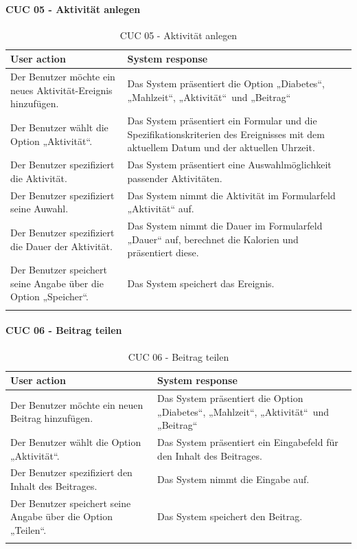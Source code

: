 \paragraph{CUC 05 - Aktivität anlegen}
\begin{center}
	\begin{longtable}[H]{|p{6cm}|p{6cm}|}
		\hline
		\textbf{User action} & \textbf{System response}\\
		\hline
		Der Benutzer möchte ein neues Aktivität-Ereignis hinzufügen. & Das System präsentiert die Option „Diabetes“, „Mahlzeit“, „Aktivität“\ und „Beitrag“\\
		\hline
		Der Benutzer wählt die Option „Aktivität“. &  Das System präsentiert ein Formular und die Spezifikationskriterien des Ereignisses mit dem aktuellem Datum und der aktuellen Uhrzeit.\\
		\hline
		Der Benutzer spezifiziert die Aktivität. & Das System präsentiert eine Auswahlmöglichkeit passender Aktivitäten.\\
		\hline
		Der Benutzer spezifiziert seine Auwahl. & Das System nimmt die Aktivität im Formularfeld „Aktivität“ auf.\\
		\hline
		Der Benutzer spezifiziert die Dauer der Aktivität. & Das System nimmt die Dauer im Formularfeld „Dauer“ auf, berechnet die Kalorien und präsentiert diese.\\
		\hline
		Der Benutzer speichert seine Angabe über die Option „Speicher“. & Das System speichert das Ereignis.\\
		\hline
		\captionsetup{justification=centering}
		\caption{CUC 05 - Aktivität anlegen}
		\label{tab:Persona Use Cases 5}
	\end{longtable}
\end{center}
\paragraph{CUC 06 - Beitrag teilen}
\begin{center}
\begin{longtable}[H]{|p{6cm}|p{6cm}|}
	\hline
	\textbf{User action} & \textbf{System response}\\
	\hline
	Der Benutzer möchte ein neuen Beitrag hinzufügen. & Das System präsentiert die Option „Diabetes“, „Mahlzeit“, „Aktivität“\ und „Beitrag“\\
	\hline
	Der Benutzer wählt die Option „Aktivität“. &  Das System präsentiert ein Eingabefeld für den Inhalt des Beitrages.\\
	\hline
	Der Benutzer spezifiziert den Inhalt des Beitrages. & Das System nimmt die Eingabe auf.\\
	\hline
	Der Benutzer speichert seine Angabe über die Option „Teilen“. & Das System speichert den Beitrag.\\
	\hline
	\captionsetup{justification=centering}
	\caption{CUC 06 - Beitrag teilen}
	\label{tab:Persona Use Cases 6}
\end{longtable}
\end{center}